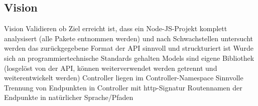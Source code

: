 \subsection{Vision} \label{subsec:Vision}
Vision
    Validieren ob Ziel erreicht ist, dass
        ein Node-JS-Projekt komplett analysisert (alle Pakete entnommen werden) und nach Schwachstellen untersucht werden
        das zurückgegebene Format der \ac{API} sinnvoll und struckturiert ist
        Wurde sich an programmiertechnische Standards gehalten
            Models sind eigene Bibliothek (losgelöst von der \ac{API}, können weiterverwendet werden getrennt und weiterentwickelt werden)
            Controller liegen im Controller-Namespace
            Sinnvolle Trennung von Endpunkten in Controller mit http-Signatur
            Routennamen der Endpunkte in natürlicher Sprache/Pfaden